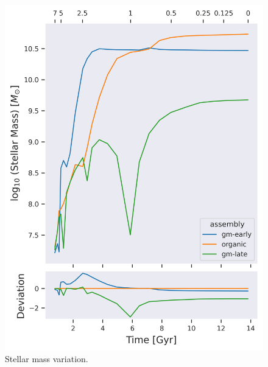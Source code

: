 \documentclass[twocolumn]{article}
\begin{document}
	\begin{figure}
			\centering 
			\includegraphics[width=\columnwidth]{./Stellar_mass.png}
			\caption{Stellar mass variation.}
	\end{figure}
\end{document}
